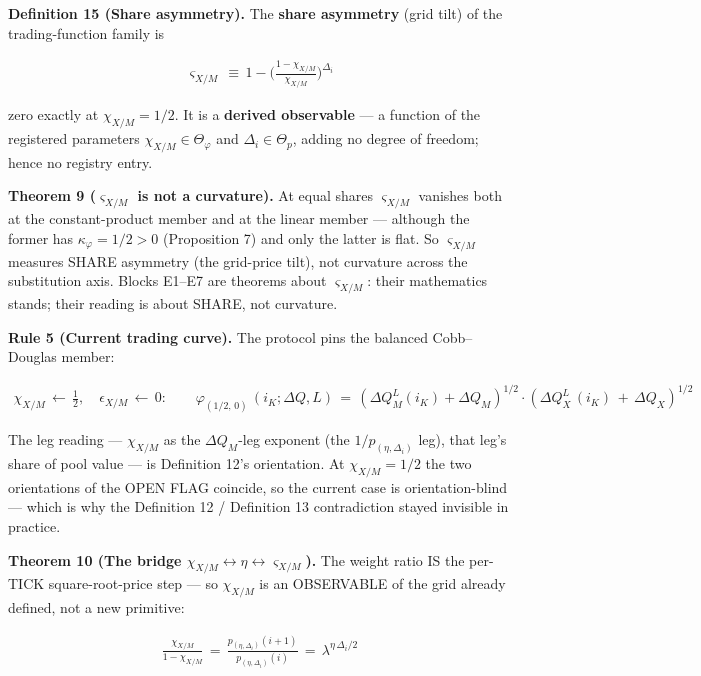 \documentclass[11pt]{article}
\renewcommand{\_}{\textunderscore\allowbreak}
\begin{document}
\textbf{Definition 15 (Share asymmetry).} The \textbf{share asymmetry} (grid tilt) of the trading-function family is

\[
    \begin{aligned}
        \varsigma_{X/M} \, \equiv \, 1 - \Big(\frac{1-\chi_{X/M}}{\chi_{X/M}}\Big)^{\Delta_i}
    \end{aligned}
\]

zero exactly at \(\chi_{X/M} = 1/2\). It is a \textbf{derived observable} --- a function of the registered parameters \(\chi_{X/M} \in \Theta_{\varphi}\) and \(\Delta_i \in \Theta_p\), adding no degree of freedom; hence no registry entry.

\textbf{Theorem 9 (\(\varsigma_{X/M}\) is not a curvature).} At equal shares \(\varsigma_{X/M}\) vanishes both at the constant-product member and at the linear member --- although the former has \(\kappa_{\varphi} = 1/2 > 0\) (Proposition 7) and only the latter is flat. So \(\varsigma_{X/M}\) measures SHARE asymmetry (the grid-price tilt), not curvature across the substitution axis. Blocks E1--E7 are theorems about \(\varsigma_{X/M}\): their mathematics stands; their reading is about SHARE, not curvature.

\textbf{Rule 5 (Current trading curve).} The protocol pins the balanced Cobb--Douglas member:

\[
    \begin{aligned}
        \chi_{X/M} \, \leftarrow \, \tfrac{1}{2}, \quad \epsilon_{X/M} \, \leftarrow \, 0: \qquad
        \varphi_{(1/2,\,0)} \, (i_K ; \Delta Q , L)\, = \, (\Delta Q_M^{L} (i_K) + \Delta Q_M)^{1/2}\cdot(\Delta Q_X^L \, (i_K) \, + \, \Delta Q_X)^{1/2}
    \end{aligned}
\]

The leg reading --- \(\chi_{X/M}\) as the \(\Delta Q_M\)-leg exponent (the \(1/p_{(\eta,\Delta_i)}\) leg), that leg's share of pool value --- is Definition 12's orientation. At \(\chi_{X/M} = 1/2\) the two orientations of the OPEN FLAG coincide, so the current case is orientation-blind --- which is why the Definition 12 / Definition 13 contradiction stayed invisible in practice.

\textbf{Theorem 10 (The bridge \(\chi_{X/M} \leftrightarrow \eta \leftrightarrow \varsigma_{X/M}\)).} The weight ratio IS the per-TICK square-root-price step --- so \(\chi_{X/M}\) is an OBSERVABLE of the grid already defined, not a new primitive:

\[
    \begin{aligned}
        \frac{\chi_{X/M}}{1-\chi_{X/M}} \, = \, \frac{p_{(\eta, \Delta_i)}(i+1)}{p_{(\eta, \Delta_i)}(i)} \, = \, \lambda^{\eta\,\Delta_i/2}
    \end{aligned}
\]
\end{document}
